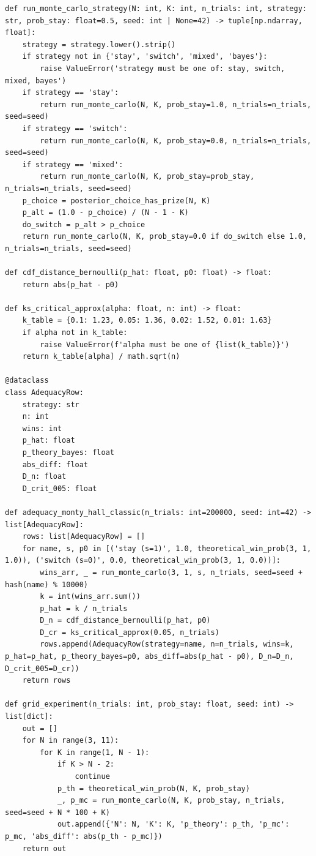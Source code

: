 \documentclass[a4paper, 14pt]{extarticle}
\begin{document}
\begin{longlisting}
\begin{verbatim}
def run_monte_carlo_strategy(N: int, K: int, n_trials: int, strategy: str, prob_stay: float=0.5, seed: int | None=42) -> tuple[np.ndarray, float]:
    strategy = strategy.lower().strip()
    if strategy not in {'stay', 'switch', 'mixed', 'bayes'}:
        raise ValueError('strategy must be one of: stay, switch, mixed, bayes')
    if strategy == 'stay':
        return run_monte_carlo(N, K, prob_stay=1.0, n_trials=n_trials, seed=seed)
    if strategy == 'switch':
        return run_monte_carlo(N, K, prob_stay=0.0, n_trials=n_trials, seed=seed)
    if strategy == 'mixed':
        return run_monte_carlo(N, K, prob_stay=prob_stay, n_trials=n_trials, seed=seed)
    p_choice = posterior_choice_has_prize(N, K)
    p_alt = (1.0 - p_choice) / (N - 1 - K)
    do_switch = p_alt > p_choice
    return run_monte_carlo(N, K, prob_stay=0.0 if do_switch else 1.0, n_trials=n_trials, seed=seed)

def cdf_distance_bernoulli(p_hat: float, p0: float) -> float:
    return abs(p_hat - p0)

def ks_critical_approx(alpha: float, n: int) -> float:
    k_table = {0.1: 1.23, 0.05: 1.36, 0.02: 1.52, 0.01: 1.63}
    if alpha not in k_table:
        raise ValueError(f'alpha must be one of {list(k_table)}')
    return k_table[alpha] / math.sqrt(n)

@dataclass
class AdequacyRow:
    strategy: str
    n: int
    wins: int
    p_hat: float
    p_theory_bayes: float
    abs_diff: float
    D_n: float
    D_crit_005: float

def adequacy_monty_hall_classic(n_trials: int=200000, seed: int=42) -> list[AdequacyRow]:
    rows: list[AdequacyRow] = []
    for name, s, p0 in [('stay (s=1)', 1.0, theoretical_win_prob(3, 1, 1.0)), ('switch (s=0)', 0.0, theoretical_win_prob(3, 1, 0.0))]:
        wins_arr, _ = run_monte_carlo(3, 1, s, n_trials, seed=seed + hash(name) % 10000)
        k = int(wins_arr.sum())
        p_hat = k / n_trials
        D_n = cdf_distance_bernoulli(p_hat, p0)
        D_cr = ks_critical_approx(0.05, n_trials)
        rows.append(AdequacyRow(strategy=name, n=n_trials, wins=k, p_hat=p_hat, p_theory_bayes=p0, abs_diff=abs(p_hat - p0), D_n=D_n, D_crit_005=D_cr))
    return rows

def grid_experiment(n_trials: int, prob_stay: float, seed: int) -> list[dict]:
    out = []
    for N in range(3, 11):
        for K in range(1, N - 1):
            if K > N - 2:
                continue
            p_th = theoretical_win_prob(N, K, prob_stay)
            _, p_mc = run_monte_carlo(N, K, prob_stay, n_trials, seed=seed + N * 100 + K)
            out.append({'N': N, 'K': K, 'p_theory': p_th, 'p_mc': p_mc, 'abs_diff': abs(p_th - p_mc)})
    return out


\end{verbatim}
\end{longlisting}
\end{document}
